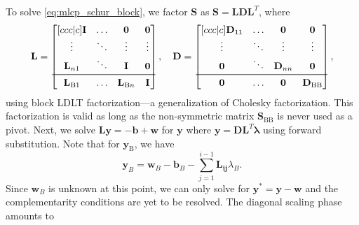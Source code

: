 \documentclass[preprint,12pt]{elsarticle}
\let\vec\bm
\let\mat\mathbf
\numberwithin{equation}{section}
\def\tB{\text{B}}
\begin{document}
To solve \eqref{eq:mlcp_schur_block}, we factor $\mat{S}$ as $\mat{S} = \mat{L}\mat{D}\mat{L}^T$, where
\begin{equation}
    \mat{L} = \begin{bmatrix}[ccc|c]
        \mat{I}      & \hdots & \mat{0}      & \mat{0} \\
        \vdots       & \ddots & \vdots       & \vdots  \\
        \mat{L}_{n1} & \ddots & \mat{I}      & \mat{0} \\
        \midrule
        \mat{L}_{\tB 1} & \hdots & \mat{L}_{\tB n} & \mat{I} \\
    \end{bmatrix}, \quad
    \mat{D} = \begin{bmatrix}[ccc|c]
        \mat{D}_{11} & \hdots & \mat{0}      & \mat{0}      \\
        \vdots       & \ddots & \vdots       & \vdots       \\
        \mat{0}      & \ddots & \mat{D}_{nn} & \mat{0}      \\
        \midrule
        \mat{0}      & \hdots & \mat{0}      & \mat{D}_{\tB \tB} \\
    \end{bmatrix},
\end{equation}
using block LDLT factorization---a generalization of Cholesky factorization.
This factorization is valid as long as the non-symmetric matrix $\mat{S}_{\text{BB}}$ is never used as a pivot.
Next, we solve $\mat{L}\vec{y} = -\vec{b} + \vec{w}$ for $\vec{y}$ where $\vec{y} = \mat{D}\mat{L}^T \vec{\lambda}$ using forward substitution.
Note that for $\vec{y}_\tB$, we have
\begin{equation}
    \vec{y}_B = \vec{w}_B - \vec{b}_B - \sum_{j=1}^{i-1} \vec{L_{ij}}\lambda_B.
\end{equation}
Since $\vec{w}_B$ is unknown at this point, we can only solve for $\vec{y}^* = \vec{y} - \vec{w}$ and the complementarity conditions are yet to be resolved.
The diagonal scaling phase amounts to
\end{document}
